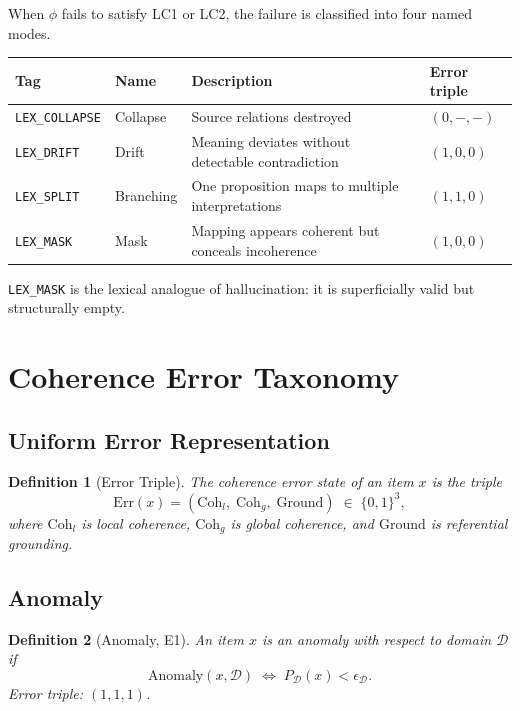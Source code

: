 \documentclass{article}
\newcommand{\ErrTriple}{\mathrm{Err}}
\newtheorem{definition}{Definition}
\begin{document}
When $\phi$ fails to satisfy LC1 or LC2, the failure is classified into four
named modes.

\begin{center}
\renewcommand{\arraystretch}{1.25}
\begin{tabular}{llll}
\toprule
Tag & Name & Description & Error triple \\
\midrule
\texttt{LEX\_COLLAPSE} & Collapse &
  Source relations destroyed & $(0,{-},{-})$ \\
\texttt{LEX\_DRIFT} & Drift &
  Meaning deviates without detectable contradiction & $(1,0,0)$ \\
\texttt{LEX\_SPLIT} & Branching &
  One proposition maps to multiple interpretations & $(1,1,0)$ \\
\texttt{LEX\_MASK} & Mask &
  Mapping appears coherent but conceals incoherence & $(1,0,0)$ \\
\bottomrule
\end{tabular}
\end{center}

\texttt{LEX\_MASK} is the lexical analogue of hallucination: it is superficially
valid but structurally empty.

\section{Coherence Error Taxonomy}
\label{sec:errors}

\subsection{Uniform Error Representation}

\begin{definition}[Error Triple]
The coherence error state of an item $x$ is the triple
\[
  \ErrTriple(x) = (\mathrm{Coh}_l,\; \mathrm{Coh}_g,\; \mathrm{Ground})
  \;\in\; \{0,1\}^3,
\]
where $\mathrm{Coh}_l$ is local coherence, $\mathrm{Coh}_g$ is global coherence,
and $\mathrm{Ground}$ is referential grounding.
\end{definition}

\subsection{Anomaly}

\begin{definition}[Anomaly, E1]
An item $x$ is an \emph{anomaly} with respect to domain $\mathcal{D}$ if
\[
  \mathrm{Anomaly}(x, \mathcal{D}) \;\iff\; P_{\mathcal{D}}(x) < \epsilon_{\mathcal{D}}.
\]
Error triple: $(1, 1, 1)$.
\end{definition}
\end{document}
